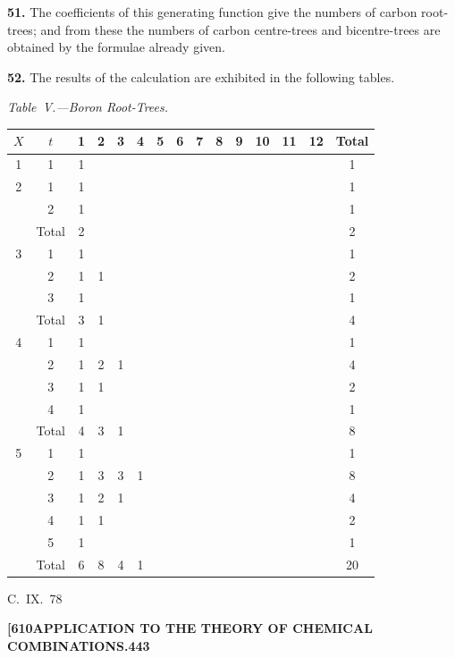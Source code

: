 \documentclass[11pt,a4paper]{article}
\begin{document}
{\medskip
\noindent\textbf{51.}
The coefficients of this generating function give the numbers of carbon root-trees; and from these the numbers of carbon centre-trees and bicentre-trees are obtained by the formulae already given.

\medskip
\noindent\textbf{52.}
The results of the calculation are exhibited in the following tables.

\medskip
\noindent\textit{Table~V.---Boron Root-Trees.}

\begin{center}
\small
\begin{longtable}{|c|c|c|c|c|c|c|c|c|c|c|c|c|c|c|}
\hline
$X$ & $t$ & 1 & 2 & 3 & 4 & 5 & 6 & 7 & 8 & 9 & 10 & 11 & 12 & Total \\
\hline
\endfirsthead
1 & 1 & 1 & & & & & & & & & & & & 1 \\
\hline
2 & 1 & 1 & & & & & & & & & & & & 1 \\
  & 2 & 1 & & & & & & & & & & & & 1 \\
  & Total & 2 & & & & & & & & & & & & 2 \\
\hline
3 & 1 & 1 & & & & & & & & & & & & 1 \\
  & 2 & 1 & 1 & & & & & & & & & & & 2 \\
  & 3 & 1 & & & & & & & & & & & & 1 \\
  & Total & 3 & 1 & & & & & & & & & & & 4 \\
\hline
4 & 1 & 1 & & & & & & & & & & & & 1 \\
  & 2 & 1 & 2 & 1 & & & & & & & & & & 4 \\
  & 3 & 1 & 1 & & & & & & & & & & & 2 \\
  & 4 & 1 & & & & & & & & & & & & 1 \\
  & Total & 4 & 3 & 1 & & & & & & & & & & 8 \\
\hline
5 & 1 & 1 & & & & & & & & & & & & 1 \\
  & 2 & 1 & 3 & 3 & 1 & & & & & & & & & 8 \\
  & 3 & 1 & 2 & 1 & & & & & & & & & & 4 \\
  & 4 & 1 & 1 & & & & & & & & & & & 2 \\
  & 5 & 1 & & & & & & & & & & & & 1 \\
  & Total & 6 & 8 & 4 & 1 & & & & & & & & & 20 \\
\hline
\end{longtable}
\end{center}
\hfill C.~IX.\ 78

\newpage
\noindent\textbf{[610}\hspace{\fill}\textbf{APPLICATION TO THE THEORY OF CHEMICAL COMBINATIONS.}\hspace{\fill}\textbf{443}

}
\end{document}
